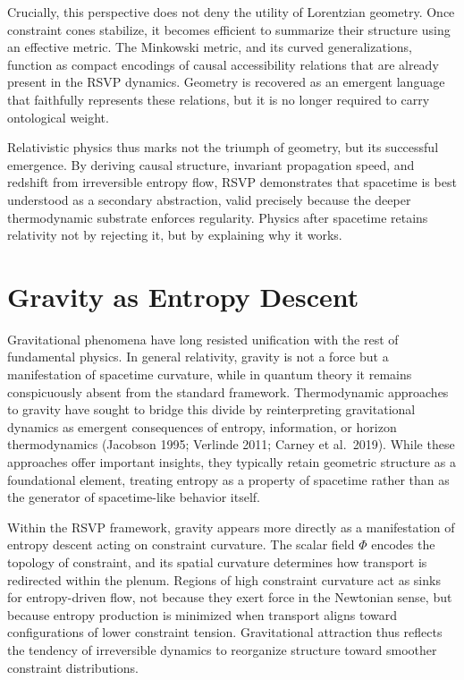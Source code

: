 \documentclass[11pt]{article}
\begin{document}
Crucially, this perspective does not deny the utility of Lorentzian geometry. Once constraint cones stabilize, it becomes efficient to summarize their structure using an effective metric. The Minkowski metric, and its curved generalizations, function as compact encodings of causal accessibility relations that are already present in the RSVP dynamics. Geometry is recovered as an emergent language that faithfully represents these relations, but it is no longer required to carry ontological weight.

Relativistic physics thus marks not the triumph of geometry, but its successful emergence. By deriving causal structure, invariant propagation speed, and redshift from irreversible entropy flow, RSVP demonstrates that spacetime is best understood as a secondary abstraction, valid precisely because the deeper thermodynamic substrate enforces regularity. Physics after spacetime retains relativity not by rejecting it, but by explaining why it works.

\section{Gravity as Entropy Descent}

Gravitational phenomena have long resisted unification with the rest of fundamental physics. In general relativity, gravity is not a force but a manifestation of spacetime curvature, while in quantum theory it remains conspicuously absent from the standard framework. Thermodynamic approaches to gravity have sought to bridge this divide by reinterpreting gravitational dynamics as emergent consequences of entropy, information, or horizon thermodynamics (Jacobson 1995; Verlinde 2011; Carney et al.\ 2019). While these approaches offer important insights, they typically retain geometric structure as a foundational element, treating entropy as a property of spacetime rather than as the generator of spacetime-like behavior itself.

Within the RSVP framework, gravity appears more directly as a manifestation of entropy descent acting on constraint curvature. The scalar field $\Phi$ encodes the topology of constraint, and its spatial curvature determines how transport is redirected within the plenum. Regions of high constraint curvature act as sinks for entropy-driven flow, not because they exert force in the Newtonian sense, but because entropy production is minimized when transport aligns toward configurations of lower constraint tension. Gravitational attraction thus reflects the tendency of irreversible dynamics to reorganize structure toward smoother constraint distributions.
\end{document}
